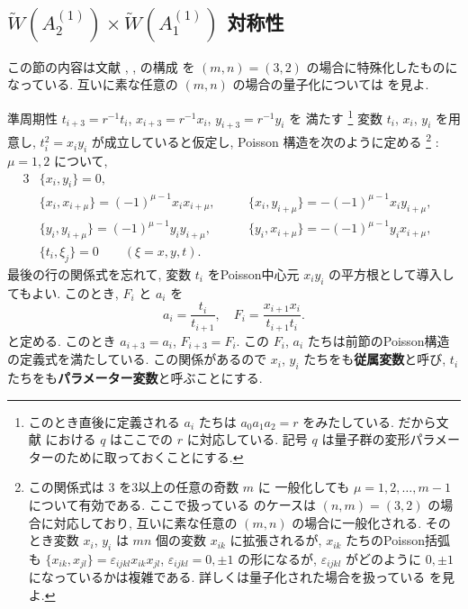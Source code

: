 \documentclass[12pt,twoside,dvipdfm]{msjproc}
\theoremstyle{definition} %
\theoremstyle{definition} %
\theoremstyle{definition} %
\numberwithin{theorem}{section}
\numberwithin{equation}{section}
\numberwithin{figure}{section}
\numberwithin{table}{section}
\newcommand\qP[1]{{\text{$q\mathrm{P}_{\text{#1}}$}}}
\newcommand\eps{\varepsilon}
\newcommand\WW{\widetilde{W}}
\begin{document}
\subsection{$\WW(A^{(1)}_2)\times\WW(A^{(1)}_1)$ 対称性}

この節の内容は文献 \cite{KNY-WxW}, \cite{KNY-qKP}, \cite{NY-RSK} の構成
を $(m,n)=(3,2)$ の場合に特殊化したものになっている.
互いに素な任意の $(m,n)$ の場合の量子化については \cite{Kuroki-WxW} を見よ.

準周期性 $t_{i+3}=r^{-1} t_i$, $x_{i+3}=r^{-1} x_i$, $y_{i+3}=r^{-1} y_i$ を
満たす%
\footnote{このとき直後に定義される $a_i$ たちは $a_0a_1a_2=r$ をみたしている.
だから文献 \cite{KNY-qPIV} における $q$ はここでの $r$ に対応している.
記号 $q$ は量子群の変形パラメーターのために取っておくことにする.}%
変数 $t_i$, $x_i$, $y_i$ を用意し, 
$t_i^2 = x_i y_i$ が成立していると仮定し, 
Poisson 構造を次のように定める%
\footnote{この関係式は $3$ を3以上の任意の奇数 $m$ に
一般化しても $\mu=1,2,\dots,m-1$ について有効である.
ここで扱っている \qP{IV} のケースは $(n,m)=(3,2)$ の場合に対応しており, 
互いに素な任意の $(m,n)$ の場合に一般化される. 
そのとき変数 $x_i$, $y_i$ は $mn$ 個の変数 $x_{ik}$ に拡張されるが, 
$x_{ik}$ たちのPoisson括弧
も $\{x_{ik},x_{jl}\}=\eps_{ijkl} x_{ik}x_{jl}$, $\eps_{ijkl}=0,\pm1$ の形になるが, 
$\eps_{ijkl}$ がどのように $0,\pm1$ になっているかは複雑である.
詳しくは量子化された場合を扱っている \cite{Kuroki-WxW} を見よ.}%
: $\mu=1,2$ について, 
\begin{alignat*}{3}
 &
 \{x_i, y_i\}=0, \quad
 \\ &
 \{x_i,x_{i+\mu}\} = (-1)^{\mu-1} x_i x_{i+\mu}, \quad
 & &
 \{x_i,y_{i+\mu}\} = - (-1)^{\mu-1} x_i y_{i+\mu}, \quad
 \\ &
 \{y_i,y_{i+\mu}\} = (-1)^{\mu-1} y_i y_{i+\mu}, \quad
 & &
 \{y_i,x_{i+\mu}\} = - (-1)^{\mu-1} y_i x_{i+\mu}, \quad
 \\ &
 \{t_i, \xi_j\}=0 \qquad (\xi=x,y,t).
\end{alignat*}
最後の行の関係式を忘れて, 変数 $t_i$ をPoisson中心元 $x_i y_i$ の平方根として導入してもよい.
このとき, $F_i$ と $a_i$ を
\begin{equation*}
 a_i = \frac{t_i}{t_{i+1}}, \quad F_i = \frac{x_{i+1}x_i}{t_{i+1}t_i}.
\end{equation*}
と定める. このとき $a_{i+3}=a_i$, $F_{i+3}=F_i$.
この $F_i$, $a_i$ たちは前節のPoisson構造の定義式を満たしている.
この関係があるので $x_i$, $y_i$ たちをも{\bf 従属変数}と呼び, 
$t_i$ たちをも{\bf パラメーター変数}と呼ぶことにする.
\end{document}
